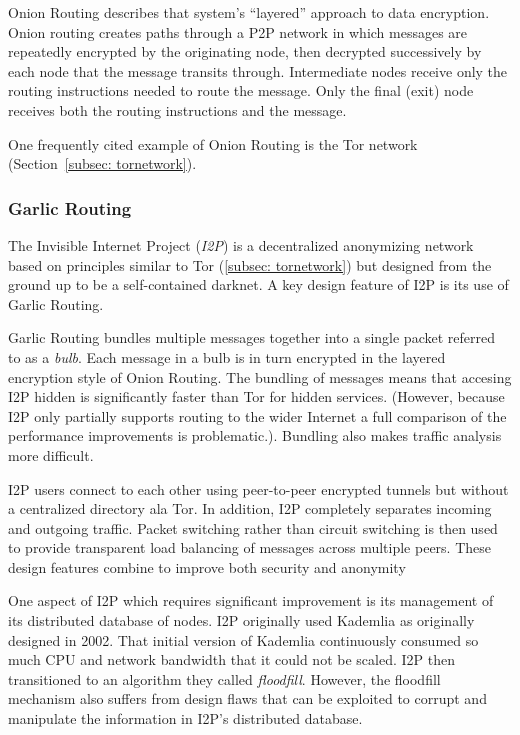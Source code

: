 Onion Routing describes that system's ``layered'' approach to data encryption. Onion routing creates paths through a P2P network in which messages are repeatedly encrypted by the originating node, then decrypted successively by each node that the message transits through. Intermediate nodes receive only the routing instructions needed to route the message. Only the final (exit) node receives both the routing instructions and the  message.

One frequently cited example of Onion Routing is the Tor network (Section~\ref{subsec: tornetwork}). 

\subsubsection{Garlic Routing}
\label{subsec-garlicrouting}
The Invisible Internet Project (\textit{I2P}) is a decentralized anonymizing network based on principles similar to Tor (\ref{subsec: tornetwork}) but designed from the ground up to be a self-contained darknet. A key design feature of I2P is its use of Garlic Routing\cite{26}.


Garlic Routing bundles multiple messages together into a single packet referred to as a \textit{bulb}. Each message in a bulb is in turn encrypted in the layered encryption style of Onion Routing. The bundling of messages means that accesing I2P hidden is significantly faster than Tor for hidden services. (However, because I2P only partially supports routing to the wider Internet a full comparison of the performance improvements is problematic.). Bundling also makes traffic analysis more difficult.

I2P users connect to each other using peer-to-peer encrypted tunnels but without a centralized directory ala Tor. In addition, I2P completely separates incoming and outgoing traffic. Packet switching rather than circuit switching is then used to provide transparent load balancing of messages across multiple peers. These design features combine to improve both security and anonymity

One aspect of I2P which requires significant improvement is its management of its distributed database of nodes. I2P originally used Kademlia as originally designed in 2002\cite{27}. That initial version of Kademlia continuously consumed so much CPU and network bandwidth that it could not be scaled. I2P then transitioned to an algorithm they called \textit{floodfill}. However, the floodfill mechanism also suffers from design flaws that can be exploited to corrupt and manipulate the information in I2P's distributed database\cite{28}.


